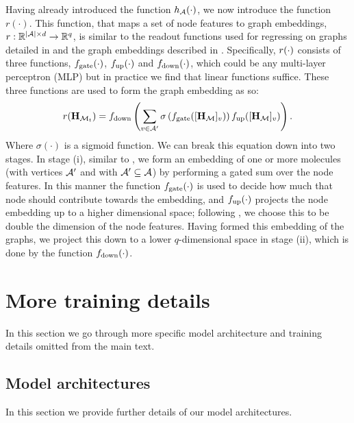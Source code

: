 Having already introduced the function $h_{{\mathcal{A}}}(\cdot)$, we now introduce the function $r(\cdot)$.
This function, that maps a set of node features to  graph embeddings, $r: \mathbb{R}^{|{\mathcal{A}}|\times d} \to \mathbb{R}^{q}$, is similar to the readout functions used for regressing on graphs detailed in \citep[Eq. 3]{gilmer2017neural} and the graph embeddings described in \citet[\S B.1]{li2018learning}. 
Specifically, $r(\cdot)$ consists of three functions, $f_\textrm{gate}(\cdot)$, $f_\textrm{up}(\cdot)$ and $f_\textrm{down}(\cdot)$, which could be any multi-layer perceptron (MLP) but in practice we find that linear functions suffice.
These three functions are used to form the graph embedding as so:
\begin{align}
	r({\mathbf{H}}_{{\mathcal{M}}_t}) = f_\textrm{down}\left(\sum_{v \in {\mathcal{A}}'} \sigma\left(f_\textrm{gate}([{\mathbf{H}}_{{\mathcal{M}}}]_v)\right) f_\textrm{up}([{\mathbf{H}}_{{\mathcal{M}}}]_v)\right).
	\label{eq:graph-embedding}
\end{align}
Where $\sigma(\cdot)$ is a sigmoid function.
We can break this equation down into two stages.
In stage (i), similar to \citet[\S B.1]{li2018learning}, we form an embedding of one or more molecules (with vertices ${\mathcal{A}}'$ and with ${\mathcal{A}}' \subseteq  {\mathcal{A}}$) by performing a gated sum over the node features. 
In this manner the function $f_\textrm{gate}(\cdot)$ is used to decide how much that node should contribute towards the embedding,
 and $f_\textrm{up}(\cdot)$ projects the node embedding up to a higher dimensional space; following \citet[\S B.1]{li2018learning}, we choose this to be double the dimension of the node features.
Having formed this embedding of the graphs, we project this down to a lower $q$-dimensional space in stage (ii), which is done by the function $f_\textrm{down}(\cdot)$. 







\section{More training details}

In this section we go through more specific model architecture and training details omitted from the main text. 

\subsection{Model architectures}
In this section we provide further details of our model architectures.

